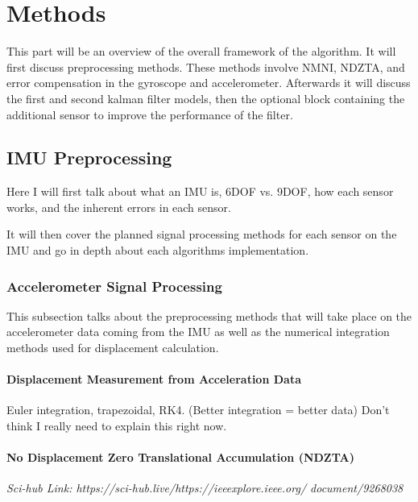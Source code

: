 \chapter{Methods}
\label{mathchapter}

This part will be an overview of the overall framework of the algorithm. It
will first discuss preprocessing methods. These methods involve NMNI, NDZTA,
and error compensation in the gyroscope and accelerometer. Afterwards it will 
discuss the first and second kalman filter models, then the optional block
containing the additional sensor to improve the performance of the filter.


\section{IMU Preprocessing}

Here I will first talk about what an IMU is, 6DOF vs. 9DOF, how each sensor
works, and the inherent errors in each sensor. 

It will then cover the planned signal processing methods for each sensor on the 
IMU and go in depth about each algorithms implementation.

\subsection{Accelerometer Signal Processing}

This subsection talks about the preprocessing methods that will take place on
the accelerometer data coming from the IMU as well as the numerical integration 
methods used for displacement calculation.

\subsubsection{Displacement Measurement from Acceleration Data}

Euler integration, trapezoidal, RK4. (Better integration = better data) 
Don't think I really need to explain this right now.

\subsubsection{No Displacement Zero Translational Accumulation (NDZTA)}

\emph{Sci-hub Link: https://sci-hub.live/https://ieeexplore.ieee.org/
document/9268038 \\ }

